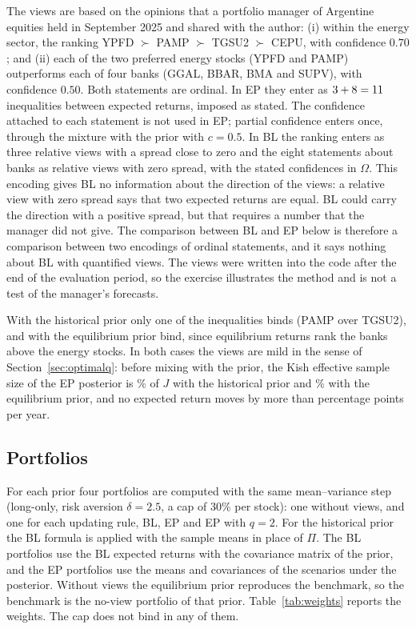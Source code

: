 \documentclass[11pt]{article}
\begin{document}
The views are based on the opinions that a portfolio manager of Argentine
equities held in September 2025 and shared with the author: (i) within the
energy sector,
the ranking YPFD $\succ$ PAMP $\succ$ TGSU2 $\succ$ CEPU, with confidence
$0.70$; and (ii) each of the two preferred energy stocks (YPFD and PAMP)
outperforms each of four banks (GGAL, BBAR, BMA and SUPV), with confidence
$0.50$. Both statements are ordinal. In EP they enter as $3 + 8 = 11$
inequalities between expected returns, imposed as stated. The confidence
attached to each statement is not used in EP; partial confidence enters
once, through the mixture with the prior with $c=0.5$.
In BL the ranking enters as three relative views with a spread close to
zero and the eight statements about banks as relative views with zero
spread, with the stated confidences in $\Omega$. This encoding gives BL no
information about the direction of the views: a relative view with zero
spread says that two expected returns are equal. BL could carry the
direction with a positive spread, but that requires a number that the
manager did not give. The comparison between BL and EP below is therefore
a comparison between two encodings of ordinal statements, and it says
nothing about BL with quantified views. The views were written
into the code after the end of the evaluation period, so the exercise
illustrates the method and is not a test of the manager's forecasts.

With the historical prior only one of the \nIneq{} inequalities binds
(PAMP over TGSU2), and with the equilibrium prior \nActiveEq{} bind, since
equilibrium returns rank the banks above the energy stocks. In both cases
the views are mild in the sense of Section~\ref{sec:optimalq}: before
mixing with the prior, the Kish effective sample size of the EP posterior
is \nEssHist\% of $J$ with the historical prior and \nEssEq\% with the
equilibrium prior,
and no expected return moves by more than \nShiftEq{} percentage points per
year.

\subsection{Portfolios}

For each prior four portfolios are computed with the same mean--variance
step (long-only, risk aversion $\delta = 2.5$, a cap of 30\% per stock):
one without views, and one for each updating rule, BL, EP and EP with
$q = 2$. For the historical prior the BL formula is applied with the
sample means in place of $\Pi$. The BL portfolios use the BL expected
returns with the covariance matrix of the prior, and the EP portfolios use
the means and covariances of the scenarios under the posterior. Without views the equilibrium prior
reproduces the benchmark, so the benchmark is the no-view portfolio of that
prior. Table~\ref{tab:weights} reports the weights. The cap does not bind
in any of them.
\end{document}
